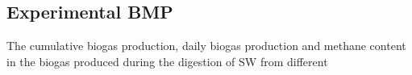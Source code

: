 \subsection{Experimental BMP}
The cumulative biogas production, daily biogas production and methane content in the biogas produced during the digestion of SW from different 